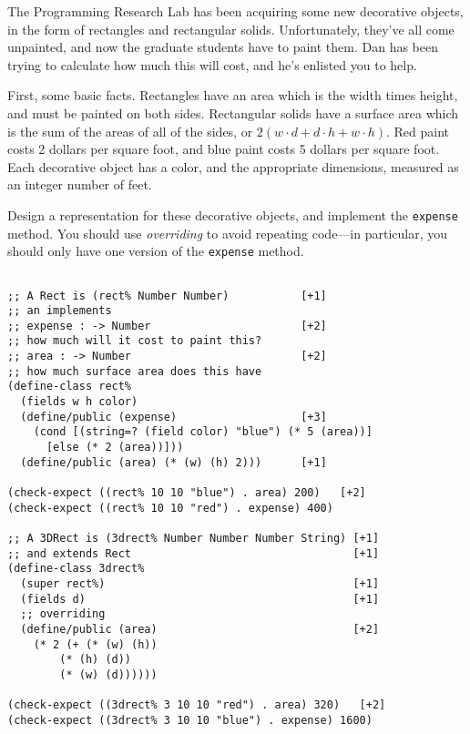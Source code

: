 \documentclass[12pt]{article}                   %
\def\pts#1{\marginpar{\footnotesize \raggedright  \fbox{#1 {\sc Points}}}}
\newenvironment{solution}{}{}
\begin{document}
\vfill\thispagestyle{empty}
\newpage

\fi



\begin{problem}\pts{19}

The Programming Research Lab has been acquiring some new decorative
objects, in the form of rectangles and rectangular solids.
Unfortunately, they've all come unpainted, and now the graduate
students have to paint them.  Dan has been trying to calculate how
much this will cost, and he's enlisted you to help.  

First, some basic facts.  Rectangles have an area which is the width
times height, and must be painted on both sides.  Rectangular solids
have a surface area which is the sum of the areas of all of the
sides, or $2 (w \cdot d + d \cdot h + w \cdot h)$. Red paint costs 2
dollars per square foot, and blue paint costs 5 dollars per square
foot.  
%
Each decorative object has a color, and the appropriate dimensions,
measured as an integer number of feet.  

Design a representation for these decorative objects, and implement
the {\tt expense} method.  You should use \emph{overriding} to avoid
repeating code---in particular, you should only have one version of
the {\tt expense} method.

\newpage
\ifrubric{}
\newpage
\fi

\begin{solution}
\begin{verbatim}

;; A Rect is (rect% Number Number)           [+1]
;; an implements
;; expense : -> Number                       [+2]
;; how much will it cost to paint this?
;; area : -> Number                          [+2]
;; how much surface area does this have
(define-class rect%
  (fields w h color)
  (define/public (expense)                   [+3]
    (cond [(string=? (field color) "blue") (* 5 (area))]
	  [else (* 2 (area))]))
  (define/public (area) (* (w) (h) 2)))      [+1]

(check-expect ((rect% 10 10 "blue") . area) 200)   [+2]
(check-expect ((rect% 10 10 "red") . expense) 400)

;; A 3DRect is (3drect% Number Number Number String) [+1]
;; and extends Rect                                  [+1]
(define-class 3drect%
  (super rect%)                                      [+1]
  (fields d)                                         [+1]
  ;; overriding
  (define/public (area)                              [+2]
    (* 2 (+ (* (w) (h))
	    (* (h) (d))
	    (* (w) (d))))))

(check-expect ((3drect% 3 10 10 "red") . area) 320)   [+2]
(check-expect ((3drect% 3 10 10 "blue") . expense) 1600)


\end{verbatim}
\end{solution}
\end{problem}
\newpage
\end{document}
